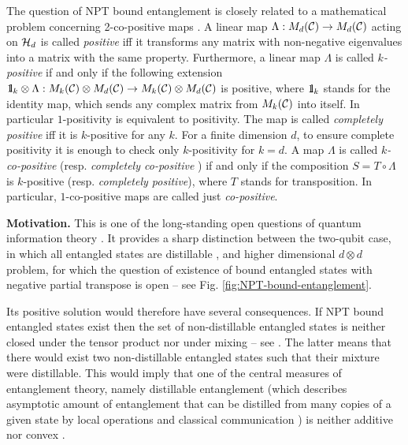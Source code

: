 \documentclass[english,aps,pra,nofootinbib,twocolumn,superscriptaddress]{revtex4-1}
\newcommand{\1}{{\rm 1\hspace{-0.9mm}l}}
\begin{document}
 
The question of  NPT bound entanglement  is closely related to a mathematical problem 
concerning 2-co-positive maps \cite{DSSTT00, Clarisse06PhD}. 
 A linear map 
$\Lambda: M_{d}({\cal C}) \rightarrow M_{d}({\cal C})$
acting on ${\cal H}_d$ is called {\it positive}
 iff it transforms any matrix with non-negative eigenvalues into a matrix with the same property. Furthermore, a linear map $\Lambda$ is called {\it $k$-positive} if and only if  the following extension  ${\1}_{k} \otimes   \Lambda : M_{k}({\cal C})   \otimes M_{d}({\cal C})  \rightarrow M_{k}({\cal C})   \otimes M_{d}({\cal C}) $ is positive, where  $
  {\1}_{k} $ stands for the identity map, which sends
   any  complex matrix from $M_{k}({\cal C})$ into itself.
   In particular $1$-positivity is equivalent to positivity. 
  The map is called {\it completely positive} iff it is $k$-positive for any $k$. 
  For a finite dimension $d$, to ensure complete positivity 
   it is enough to check only $k$-positivity for $k=d$. 
A map $\Lambda$ is called {\it $k$-co-positive} (resp. {\it completely co-positive} ) if and only if the composition
  $S= T  \circ \Lambda  $  is $k$-positive (resp. {\it completely positive}), where $T$ stands for transposition. 
  In particular, $1$-co-positive maps are called just {\it co-positive}.

\medskip

 {\bf Motivation.}                 
This is one of the long-standing open questions of quantum information theory \cite{DSSTT00, DCLB00}.
 It provides a sharp distinction between the two-qubit case, 
 in which all entangled states are distillable \cite{HHH97}, 
 and higher dimensional $d \otimes d$ problem, for which the question of existence of bound entangled states with negative partial 
 transpose is open -- see Fig. \ref{fig:NPT-bound-entanglement}.

Its positive solution would therefore have several consequences. If NPT bound entangled states exist then the set of non-distillable entangled states is neither closed under the tensor product  nor under mixing -- see \cite{Clarisse06PhD}. 
 The latter means that there would exist  two non-distillable entangled states  such that their mixture were distillable.  This  would imply  that one of the central measures of entanglement theory, namely distillable entanglement (which describes asymptotic amount of entanglement that can be distilled from many copies of a given state by local operations and classical communication \cite{HHHH09}) is neither additive nor convex \cite{Clarisse06PhD}.
\end{document}

